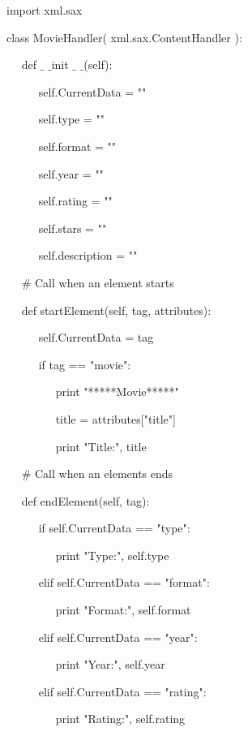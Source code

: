 \documentclass{wileySix}
\begin{document}
\begin{myEnumerate}
\begin{myEnumerate}
	\vspace{12pt}
	\noindent 
	import xml.sax \par
	\vspace{12pt}
	\noindent 
	class MovieHandler( xml.sax.ContentHandler ): \par
	\noindent 
	~~ def  $  \_  $ $  \_  $init $  \_  $ $  \_  $(self): \par
	\noindent 
	~~~~~ self.CurrentData = "" \par
	\noindent 
	~~~~~ self.type = "" \par
	\noindent 
	~~~~~ self.format = "" \par
	\noindent 
	~~~~~ self.year = "" \par
	\noindent 
	~~~~~ self.rating = "" \par
	\noindent 
	~~~~~ self.stars = "" \par
	\noindent 
	~~~~~ self.description = "" \par
	\vspace{12pt}
	\noindent 
	~~  $  \#  $ Call when an element starts \par
	\noindent 
	~~ def startElement(self, tag, attributes): \par
	\noindent 
	~~~~~ self.CurrentData = tag \par
	\noindent 
	~~~~~ if tag == "movie": \par
	\noindent 
	~~~~~~~~ print "*****Movie*****" \par
	\noindent 
	~~~~~~~~ title = attributes["title"] \par
	\noindent 
	~~~~~~~~ print "Title:", title \par
	\vspace{12pt}
	\noindent 
	~~  $  \#  $ Call when an elements ends \par
	\noindent 
	~~ def endElement(self, tag): \par
	\noindent 
	~~~~~ if self.CurrentData == "type": \par
	\noindent 
	~~~~~~~~ print "Type:", self.type \par
	\noindent 
	~~~~~ elif self.CurrentData == "format": \par
	\noindent 
	~~~~~~~~ print "Format:", self.format \par
	\noindent 
	~~~~~ elif self.CurrentData == "year": \par
	\noindent 
	~~~~~~~~ print "Year:", self.year \par
	\noindent 
	~~~~~ elif self.CurrentData == "rating": \par
	\noindent 
	~~~~~~~~ print "Rating:", self.rating \par

\end{myEnumerate}
\end{myEnumerate}
\end{document}
